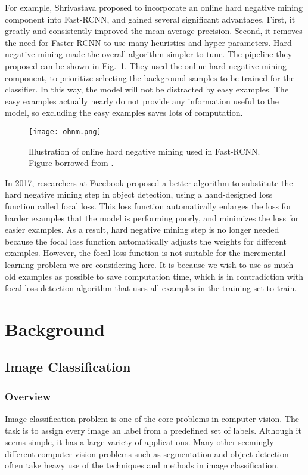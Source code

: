 For example, Shrivastava\cite{shrivastava2016training} proposed to incorporate an online hard negative mining component into Fast-RCNN, and gained several significant advantages. First, it greatly and consistently improved the mean average precision. Second, it removes the need for Faster-RCNN to use many heuristics and hyper-parameters. Hard negative mining made the overall algorithm simpler to tune. The pipeline they proposed can be shown in Fig.~\ref{fig:ohnm}. They used the online hard negative mining component, to prioritize selecting the background samples to be trained for the classifier. In this way, the model will not be distracted by easy examples. The easy examples actually nearly do not provide any information useful to the model, so excluding the easy examples saves lots of computation.
\begin{figure}[!htp]
	\centering
	\texttt{[image: ohnm.png]}
	\caption[Illustration of online hard negative mining used in Fast-RCNN]
	{Illustration of online hard negative mining\cite{shrivastava2016training} used in Fast-RCNN. Figure borrowed from \parencite{shrivastava2016training}.}
	\label{fig:ohnm}
\end{figure}

In 2017, researchers at Facebook proposed a better algorithm to substitute the hard negative mining step in object detection, using a hand-designed loss function called focal loss\cite{lin2017focal}. This loss function automatically enlarges the loss for harder examples that the model is performing poorly, and minimizes the loss for easier examples. As a result, hard negative mining step is no longer needed because the focal loss function automatically adjusts the weights for different examples. However, the focal loss function is not suitable for the incremental learning problem we are considering here. It is because we wish to use as much old examples as possible to save computation time, which is in contradiction with focal loss detection algorithm that uses all examples in the training set to train.

\chapter{Background}

\section{Image Classification}
\subsection{Overview}
Image classification problem is one of the core problems in computer vision. The task is to assign every image an label from a predefined set of labels. Although it seems simple, it has a large variety of applications. Many other seemingly different computer vision problems such as segmentation and object detection often take heavy use of the techniques and methods in image classification. 

